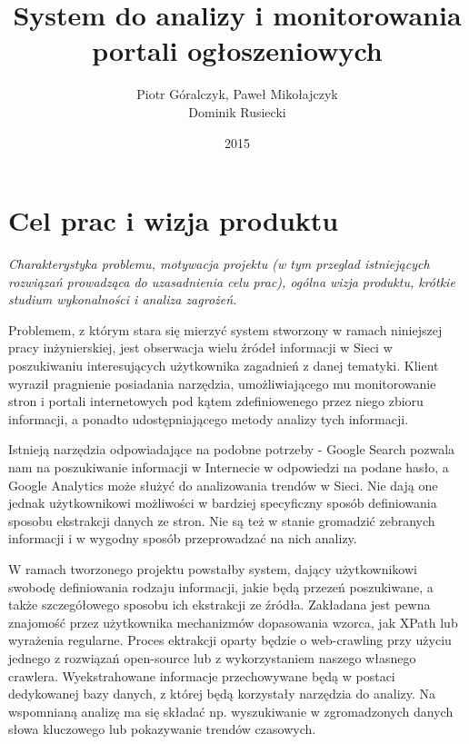 \documentclass[polish,12pt]{aghthesis}
\author{Piotr Góralczyk, Paweł Mikołajczyk\\ Dominik Rusiecki}
\title{System do analizy i monitorowania\\ portali ogłoszeniowych}
\date{2015}
\begin{document}
\maketitle



\section{Cel prac i wizja produktu}
\label{sec:cel-wizja}
\emph{Charakterystyka problemu, motywacja projektu (w tym przeglad
  istniejących rozwiązań prowadząca do uzasadnienia celu prac), ogólna
  wizja produktu, krótkie studium wykonalności i analiza zagrożeń.}

Problemem, z którym stara się mierzyć system stworzony w ramach niniejszej
pracy inżynierskiej, jest obserwacja wielu źródeł informacji w Sieci w 
poszukiwaniu interesujących użytkownika zagadnień z danej tematyki. Klient 
wyraził pragnienie posiadania narzędzia, umożliwiającego mu monitorowanie 
stron i portali internetowych pod kątem zdefiniowenego przez niego zbioru 
informacji, a ponadto udostępniającego metody analizy tych informacji. 

Istnieją narzędzia odpowiadające na podobne potrzeby - Google Search pozwala 
nam na poszukiwanie informacji w Internecie w odpowiedzi na podane hasło, a
Google Analytics może służyć do analizowania trendów w Sieci.
Nie dają one jednak użytkownikowi możliwości w bardziej specyficzny sposób
definiowania sposobu ekstrakcji danych ze stron. Nie są też w stanie gromadzić
zebranych informacji i w wygodny sposób przeprowadzać na nich analizy. 

W ramach tworzonego projektu powstałby system, dający użytkownikowi swobodę
definiowania rodzaju informacji, jakie będą przezeń poszukiwane, a także 
szczegółowego sposobu ich ekstrakcji ze źródła. Zakładana jest pewna znajomość
 przez użytkownika mechanizmów dopasowania wzorca, jak XPath lub wyrażenia 
regularne. Proces ektrakcji oparty będzie o web-crawling przy użyciu jednego
z rozwiązań open-source lub z wykorzystaniem naszego własnego crawlera. 
Wyekstrahowane informacje przechowywane będą w postaci dedykowanej bazy danych, 
z której będą korzystały narzędzia do analizy. Na wspomnianą analizę ma się 
składać np. wyszukiwanie w zgromadzonych danych słowa kluczowego lub pokazywanie
 trendów czasowych.
\end{document}
